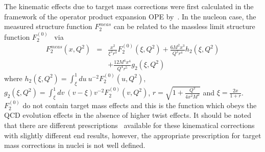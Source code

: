 
The kinematic effects due to target mass corrections were first calculated in
the framework of the operator product expansion OPE by~\cite{georgi_tmc}.  In
the nucleon case, the measured structure function $F_2^{meas}$ can be related
to the massless limit structure function $F_2^{(0)}$~\cite
{Schienbein_tarmass_rev} via
%
\begin{eqnarray} \nonumber  \label{tarmass_eqn}
F_2^{meas}(x,Q^2)&=&\frac{x^2}{\xi^2 r^{3}}F_2^{(0)}(\xi,Q^2) + \frac{6M^2x^3}{Q^2 r^{4}}h_2(\xi,Q^2)\\
&& +\frac{12M^{4}x^4}{Q^{4} r^{5}}g_2(\xi,Q^2)
\end{eqnarray}
%
where $h_2(\xi,Q^2) =\int_{\xi}^{1}du~u^{-2} F_2^{(0)}(u,Q^2)$, $g_2(\xi,Q^2)
=\int_{\xi}^{1}dv~(v-\xi)v^{-2} F_2^{(0)}(v,Q^2)$, $r=\sqrt{1+\frac{Q^2}{
4x^2M^2}}$ and $\xi = \frac{2x}{1+r}$. $F_2^{(0)}$ do not contain target mass
effects and this is the function which obeys the QCD evolution effects in the
absence of higher twist effects. It should be noted that there are different
prescriptions~\cite {Schienbein_tarmass_rev, Accardi_tarmass2008plb,
Accardi_tarmass2008jhep} available for these kinematical corrections with
slightly different end results, however, the appropriate prescription for
target mass corrections in nuclei is not well defined.

